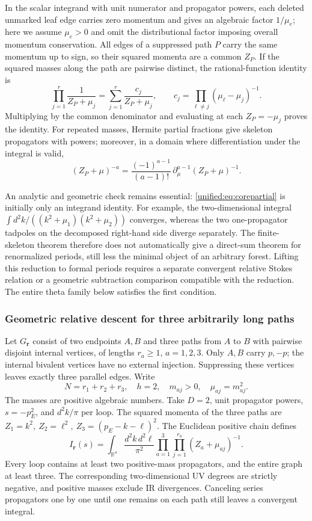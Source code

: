\documentclass[11pt,a4paper,oneside]{article}
\theoremstyle{plain}
\theoremstyle{definition}
\theoremstyle{remark}
\numberwithin{equation}{section}
\begin{document}
In the scalar integrand with unit numerator and propagator powers, each deleted unmarked leaf edge carries zero momentum
and gives an algebraic factor $1/\mu_e$; here we assume $\mu_e>0$ and omit the distributional factor imposing overall momentum conservation.
All edges of a suppressed path $P$ carry the same momentum up to sign, so their squared momenta are a common $Z_P$.
If the squared masses along the path are pairwise distinct, the rational-function identity is
\begin{equation}\label{unified:eq:corepartial}
 \prod_{j=1}^{r}\frac1{Z_P+\mu_j}
 =\sum_{j=1}^{r}\frac{c_j}{Z_P+\mu_j},\qquad
 c_j=\prod_{\ell\ne j}(\mu_\ell-\mu_j)^{-1}.
\end{equation}
Multiplying by the common denominator and evaluating at each $Z_P=-\mu_j$ proves the identity.
For repeated masses, Hermite partial fractions give skeleton propagators with powers;
moreover, in a domain where differentiation under the integral is valid,
\[
 (Z_P+\mu)^{-a}
 =\frac{(-1)^{a-1}}{(a-1)!}\,
       \partial_\mu^{a-1}(Z_P+\mu)^{-1}.
\]

An analytic and geometric check remains essential: \eqref{unified:eq:corepartial} is initially only an integrand identity.
For example, the two-dimensional integral
$\int d^2k/((k^2+\mu_1)(k^2+\mu_2))$ converges,
whereas the two one-propagator tadpoles on the decomposed right-hand side diverge separately.
The finite-skeleton theorem therefore does not automatically give a direct-sum theorem for renormalized periods, still less the minimal object of an arbitrary forest.
Lifting this reduction to formal periods requires a separate convergent relative Stokes relation
or a geometric subtraction comparison compatible with the reduction. The entire theta family below satisfies the first condition.

\subsubsection{Geometric relative descent for three arbitrarily long paths}
Let $G_{\mathbf r}$ consist of two endpoints $A,B$ and three paths from $A$ to $B$ with pairwise disjoint internal vertices,
of lengths $r_a\ge1$, $a=1,2,3$.
Only $A,B$ carry $p,-p$; the internal bivalent vertices have no external injection.
Suppressing these vertices leaves exactly three parallel edges. Write
\[
 N=r_1+r_2+r_3,\quad h=2,\quad
 m_{aj}>0,\quad\mu_{aj}=m_{aj}^2 .
\]
The masses are positive algebraic numbers. Take $D=2$, unit propagator powers, $s=-p_E^2$, and $d^2k/\pi$ per loop.
The squared momenta of the three paths are
$Z_1=k^2,\ Z_2=\ell^2,\ Z_3=(p_E-k-\ell)^2$.
The Euclidean positive chain defines
\[
 I_{\mathbf r}(s)=
 \int_{\mathbb R^4}\frac{d^2k\,d^2\ell}{\pi^2}
       \prod_{a=1}^3\prod_{j=1}^{r_a}(Z_a+\mu_{aj})^{-1}.
\]
Every loop contains at least two positive-mass propagators, and the entire graph at least three.
The corresponding two-dimensional UV degrees are strictly negative, and positive masses exclude IR divergences.
Canceling series propagators one by one until one remains on each path still leaves a convergent integral.
\end{document}
